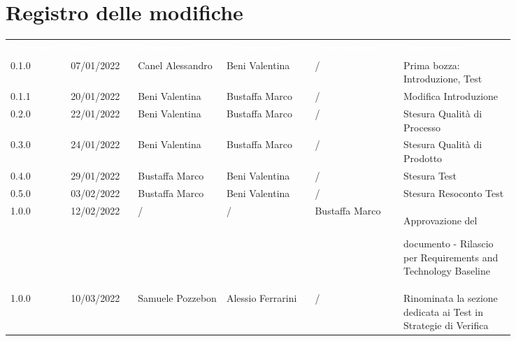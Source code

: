 \section*{Registro delle modifiche}

{\renewcommand{\arraystretch}{1.5}
\scriptsize
\begin{tabular}{p{0.10\linewidth}p{0.10\linewidth}p{0.15\linewidth}p{0.15\linewidth}p{0.15\linewidth}p{0.19\linewidth}}
	\rowcolor[RGB]{33, 73, 50}
	\textcolor{white}{\textbf{Versione}} & \textcolor{white}{\textbf{Data}} &
	\textcolor{white}{\textbf{Redattore}} & \textcolor{white}{\textbf{Verificatore}} &
	\textcolor{white}{\textbf{Approvatore}} & \textcolor{white}{\textbf{Descrizione}}\\
	\rowcolor[RGB]{216, 235, 171}
	0.1.0 & 07/01/2022 & Canel Alessandro& Beni Valentina &/& Prima bozza: Introduzione, Test\\
	\rowcolor[RGB]{233, 245, 206}
	0.1.1 & 20/01/2022 & Beni Valentina& Bustaffa Marco &/& Modifica Introduzione\\
	\rowcolor[RGB]{216, 235, 171}
	0.2.0 & 22/01/2022 & Beni Valentina& Bustaffa Marco &/& Stesura Qualità di Processo\\
	\rowcolor[RGB]{233, 245, 206}
	0.3.0 & 24/01/2022 & Beni Valentina& Bustaffa Marco &/& Stesura Qualità di Prodotto\\
	\rowcolor[RGB]{216, 235, 171}
	0.4.0 & 29/01/2022 & Bustaffa Marco& Beni Valentina &/& Stesura Test\\
	\rowcolor[RGB]{233, 245, 206}
	0.5.0 & 03/02/2022 & Bustaffa Marco& Beni Valentina &/& Stesura Resoconto Test\\
	\rowcolor[RGB]{216, 235, 171}
	1.0.0 & 12/02/2022 & / & / & Bustaffa Marco & Approvazione del \par documento - Rilascio per Requirements and Technology Baseline\\ 
	\rowcolor[RGB]{233, 245, 206}
  1.0.0 & 10/03/2022 & Samuele Pozzebon & Alessio Ferrarini &/& Rinominata la
  sezione dedicata ai Test in Strategie di Verifica\\
\end{tabular}
}
